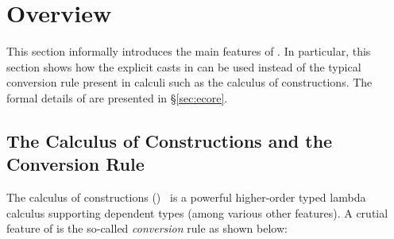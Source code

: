 \newcommand{\invisiblecomments}{%
  \let\onelinecomment=\empty
  \let\commentbegin=\empty
  \let\commentend=\empty}

\visiblecomments

\newlength{\blanklineskip}
\setlength{\blanklineskip}{0.66084ex}

\newcommand{\hsindent}[1]{\quad}%
\let\hspre\empty
\let\hspost\empty
\newcommand{\NB}{\textbf{NB}}
\newcommand{\Todo}[1]{$\langle$\textbf{To do:}~#1$\rangle$}

\EndFmtInput
\makeatother
%

\section{Overview}

This section informally introduces the main features of \name. In
particular, this section shows how the explicit casts in \name can be
used instead of the typical conversion rule present in calculi such as
the calculus of constructions. The formal details of \name are
presented in \S\ref{sec:ecore}.

\subsection{The Calculus of Constructions and the Conversion Rule}
\label{sec:coc}

The calculus of constructions (\coc)~\cite{coc} is a powerful
higher-order typed lambda calculus supporting dependent types (among
various other features).  A crutial
feature of \coc is the so-called \emph{conversion}
rule as shown below: \ottusedrule{\ottdruleTccXXConv{}}


